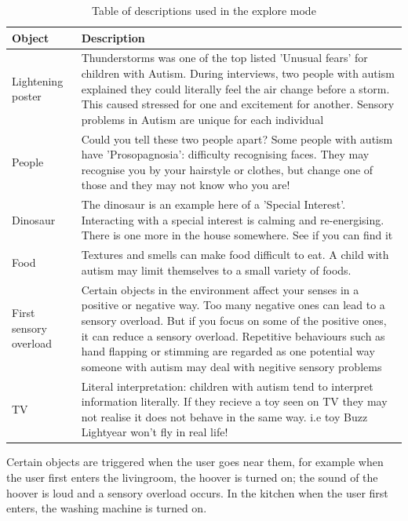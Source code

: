 \documentclass[11pt]{report}
\begin{document}
\begin{table}[H]
    \begin{tabular}{ | p{4cm} | p{10cm}|}
    \hline
    \textbf{Object} & \textbf{Description} \\                                                                                                                                                                                    
	\hline
	Lightening poster & Thunderstorms was one of the top listed 'Unusual fears' for children with Autism. During interviews, two people with autism explained they could literally feel the air change before a storm. This caused stressed for one and excitement for another. Sensory problems in Autism are unique for each individual \\ \hline
 	People & Could you tell these two people apart? Some people with autism have 'Prosopagnosia': difficulty recognising faces. They may recognise you by your hairstyle or clothes, but change one of those and they may not know who you are! \\ \hline
 	Dinosaur & The dinosaur is an example here of a 'Special Interest'. Interacting with a special interest is calming and re-energising. There is one more in the house somewhere. See if you can find it \\ \hline
 	Food & Textures and smells can make food difficult to eat. A child with autism may limit themselves to a small variety of foods. \\ \hline
 	First sensory overload & Certain objects in the environment affect your senses in a positive or negative way. Too many negative ones can lead to a sensory overload. But if you focus on some of the positive ones, it can reduce a sensory overload. Repetitive behaviours such as hand flapping or stimming are regarded as one potential way someone with autism may deal with negitive sensory problems \\ \hline
 	TV & Literal interpretation: children with autism tend to interpret information literally. If they recieve a toy seen on TV they may not realise it does not behave in the same way. i.e toy Buzz Lightyear won't fly in real life! \\ \hline
    \hline
    \end{tabular}
    \label{response_scores}
    \caption{Table of descriptions used in the explore mode}
\end{table}

Certain objects are triggered when the user goes near them, for example when the user first enters the livingroom, the hoover is turned on; the sound of the hoover is loud and a sensory overload occurs. In the kitchen when the user first enters, the washing machine is turned on.
\end{document}
